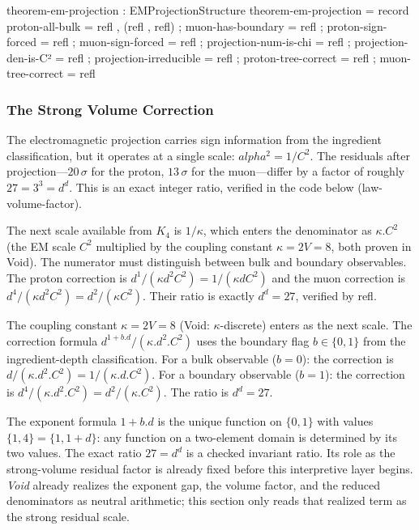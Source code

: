 \documentclass[11pt,a4paper]{book}
\def\alpha{alpha}%
\def\cdot{.}%
\def\texttt#1{#1}%
\begin{document}
\begin{code}
theorem-em-projection : EMProjectionStructure
theorem-em-projection = record
  { proton-all-bulk       = refl , (refl , refl)
  ; muon-has-boundary     = refl
  ; proton-sign-forced    = refl
  ; muon-sign-forced      = refl
  ; projection-num-is-chi = refl
  ; projection-den-is-C²  = refl
  ; projection-irreducible = refl
  ; proton-tree-correct   = refl
  ; muon-tree-correct     = refl
  }
\end{code}

\subsubsection*{The Strong Volume Correction}

The electromagnetic projection carries sign information from the
ingredient classification, but it operates at a single scale:
$\alpha^2 = 1/C^2$.  The residuals after projection---$20\,\sigma$
for the proton, $13\,\sigma$ for the muon---differ by a factor of
roughly $27 = 3^3 = d^d$.  This is an exact integer ratio, verified
in the code below (\texttt{law-volume-factor}).

The next scale available from $K_4$ is $1/\kappa$, which enters the
denominator as $\kappa \cdot C^2$ (the EM scale $C^2$ multiplied by
the coupling constant $\kappa = 2V = 8$, both proven in Void).
The numerator must distinguish between bulk and boundary observables.
The proton correction is $d^1 / (\kappa d^2 C^2) = 1/(\kappa d C^2)$
and the muon correction is $d^4 / (\kappa d^2 C^2) = d^2/(\kappa C^2)$.
Their ratio is exactly $d^d = 27$, verified by \texttt{refl}.

The coupling constant $\kappa = 2V = 8$ (Void: \texttt{$\kappa$-discrete})
enters as the next scale. The correction formula
$d^{1 + b \cdot d}/(\kappa \cdot d^2 \cdot C^2)$ uses the boundary flag
$b \in \{0, 1\}$ from the ingredient-depth classification.
For a bulk observable ($b = 0$): the correction
is $d/(\kappa \cdot d^2 \cdot C^2) = 1/(\kappa \cdot d \cdot C^2)$.
For a boundary observable ($b = 1$): the correction
is $d^4/(\kappa \cdot d^2 \cdot C^2) = d^2/(\kappa \cdot C^2)$.
The ratio is $d^d = 27$.

The exponent formula $1 + b \cdot d$ is the unique function on
$\{0,1\}$ with values $\{1, 4\} = \{1, 1+d\}$: any function on a
two-element domain is determined by its two values.
The exact ratio $27 = d^d$ is a checked invariant ratio. Its role as
the strong-volume residual factor is already fixed before this
interpretive layer begins.
\textit{Void} already realizes the exponent gap, the volume factor,
and the reduced denominators as neutral arithmetic; this section only
reads that realized term as the strong residual scale.
\end{document}

